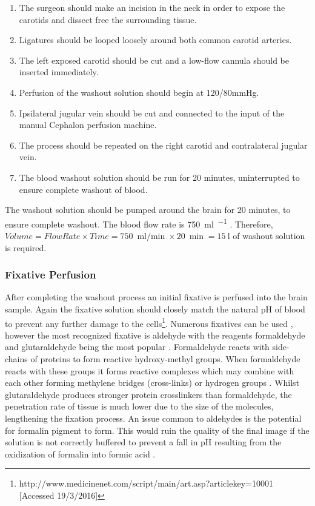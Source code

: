 \documentclass[a4paper, 11pt]{article}
\numberwithin{equation}{section}
\begin{document}
\begin{enumerate}
\item The surgeon should make an incision in the neck in order to expose the carotids and dissect free the surrounding tissue. 
\item Ligatures should be looped loosely around both common carotid arteries. 
\item The left exposed carotid should be cut and a low-flow cannula should be inserted immediately.
\item Perfusion of the washout solution should begin at 120/80mmHg.
\item Ipsilateral jugular vein should be cut and connected to the input of the manual Cephalon perfusion machine.
\item The process should be repeated on the right carotid and contralateral jugular vein.
\item The blood washout solution should be run for 20 minutes, \cite{Aldehyde_stabilized_cryopreservation} uninterrupted to ensure complete washout of blood. 
\end{enumerate}

The washout solution should be pumped around the brain for 20 minutes, to ensure complete washout. The blood flow rate is \SI{750}{\milli\litre\per\min} \cite{bloodflowrate}. Therefore, $Volume= Flow Rate\times Time = \SI{750}{\milli\litre\per\min} \times \SI{20}{\min}= \SI{15}{\litre} $ of washout solution is required.

\subsubsection{Fixative Perfusion}

After completing the washout process an initial fixative is perfused into the brain sample. Again the fixative solution should closely match the natural pH of blood to prevent any further damage to the cells\footnote{http://www.medicinenet.com/script/main/art.asp?articlekey=10001 [Accessed 19/3/2016]}. Numerous fixatives can be used \cite{wholemousebrain2012}\cite{pulsatilemachineperfusion}, however the most recognized fixative is aldehyde with the reagents formaldehyde and glutaraldehyde being the most popular \cite{FixationandFixativesRolls}. Formaldehyde reacts with side-chains of proteins to form reactive hydroxy-methyl groups. When formaldehyde reacts with these groups it forms reactive complexes which may combine with each other forming methylene bridges (cross-links) or hydrogen groups \cite{FixationandFixativesRolls}. Whilst glutaraldehyde produces stronger protein crosslinkers than formaldehyde, the penetration rate of tissue is much lower due to the size of the molecules, \cite{ThermofisherFixation} lengthening the fixation process. An issue common to aldehydes is the potential for formalin pigment to form. This would ruin the quality of the final image if the solution is not correctly buffered to prevent a fall in pH resulting from the oxidization of formalin into formic acid \cite{FixationandFixativesRolls}.
\end{document}
